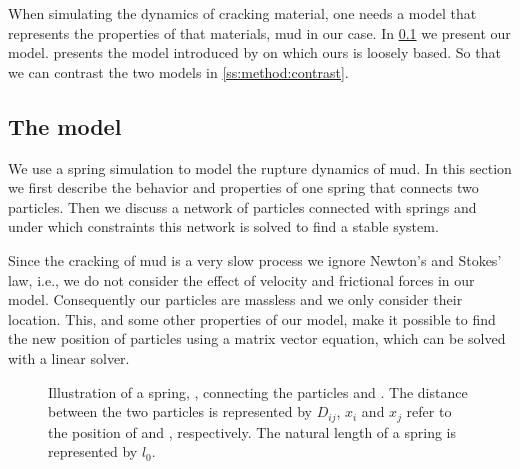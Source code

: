 

When simulating the dynamics of cracking material, one needs a model that represents the properties of that materials, mud in our case. In \cref{ss:method:model} we present our model.  presents the model introduced by \citeauthor{vogel2005studies2} on which ours is loosely based. So that we can contrast the two models in \cref{ss:method:contrast}.

\subsection{The model}\label{ss:method:model} 

We use a spring simulation to model the rupture dynamics of mud. In this section we first describe the behavior and properties of one spring that connects two particles. Then we discuss a network of particles connected with springs and under which constraints this network is solved to find a stable system.

Since the cracking of mud is a very slow process we ignore Newton's and Stokes' law, i.e., we do not consider the effect of velocity and frictional forces in our model. Consequently our particles are massless and we only consider their location. This, and some other properties of our model, make it possible to find the new position of particles using a matrix vector equation, which can be solved with a linear solver.

\begin{figure}
	\centering
	\caption{Illustration of a spring, , connecting the particles  and . The distance between the two particles is represented by $D_{ij}$, $x_i$ and $x_j$ refer to the position of  and , respectively. The natural length of a spring is represented by $l_0$.}
	\label{fig:method:spring}
\end{figure}

